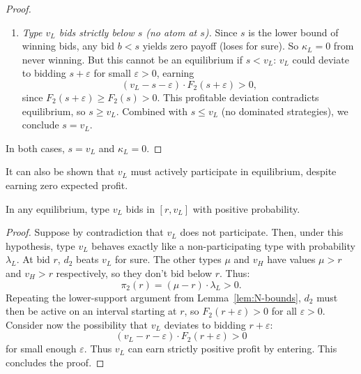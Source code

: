 \begin{proof}
\begin{enumerate}
\item \textit{Type $v_L$ bids strictly below $s$ (no atom at $s$).} Since $s$ is the lower bound of winning bids, any bid $b < s$ yields zero payoff (loses for sure). So $\kappa_L = 0$ from never winning. But this cannot be an equilibrium if $s < v_L$: $v_L$ could deviate to bidding $s + \varepsilon$ for small $\varepsilon > 0$, earning
\[
(v_L - s - \varepsilon) \cdot F_2(s + \varepsilon) > 0,
\]
since $F_2(s + \varepsilon) \geq F_2(s) > 0$. This profitable deviation contradicts equilibrium, so $s \geq v_L$. Combined with $s \leq v_L$ (no dominated strategies), we conclude $s = v_L$.
\end{enumerate}

\noindent In both cases, $s = v_L$ and $\kappa_L = 0$.
\end{proof}

\noindent It can also be shown that $v_L$ must actively participate in equilibrium, despite earning zero expected profit.

\begin{lem}\label{lem:nonbinding-participation}
In any equilibrium, type $v_L$ bids in $[r, v_L]$ with positive probability.
\end{lem}

\begin{proof}
Suppose by contradiction that $v_L$ does not participate. Then, under this hypothesis, type $v_L$ behaves exactly like a non-participating type with probability $\lambda_L$. At bid $r$, $d_2$ beats $v_L$ for sure. The other types $\mu$ and $v_H$ have values $\mu > r$ and $v_H > r$ respectively, so they don't bid below $r$. Thus:
\[
\pi_2(r) = (\mu - r) \cdot \lambda_L > 0.
\]
Repeating the lower-support argument from Lemma~\ref{lem:N-bounds}, $d_2$ must then be active on an interval starting at $r$, so $F_2(r + \varepsilon) > 0$ for all $\varepsilon > 0$. Consider now the possibility that $v_L$ deviates to bidding $r + \varepsilon$:
\[
(v_L - r - \varepsilon) \cdot F_2(r + \varepsilon) > 0
\]
for small enough $\varepsilon$. Thus $v_L$ can earn strictly positive profit by entering. This concludes the proof.
\end{proof}

